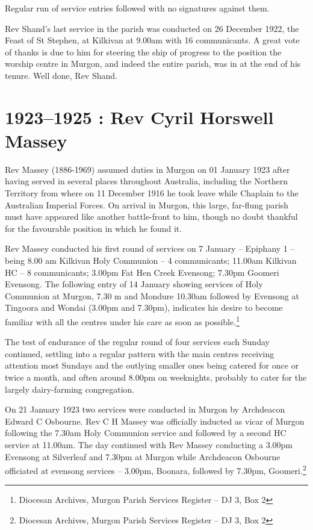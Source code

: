 Regular run of service entries followed with no signatures against them.

Rev Shand's last service in the parish was conducted on 26 December
1922, the Feast of St Stephen, at Kilkivan at 9.00am with 16
communicants. A great vote of thanks is due to him for steering the ship
of progress to the position the worship centre in Murgon, and indeed the
entire parish, was in at the end of his tenure. Well done, Rev Shand.

\begin{quote}
\end{quote}

\printendnotes
\setcounter{endnote}{0}
\chapter{1923--1925 : Rev Cyril Horswell
Massey}

Rev Massey (1886-1969) assumed duties in Murgon on 01 January 1923 after
having served in several places throughout Australia, including the
Northern Territory from where on 11 December 1916 he took leave while
Chaplain to the Australian Imperial Forces. On arrival in Murgon, this
large, far-flung parish must have appeared like another battle-front to
him, though no doubt thankful for the favourable position in which he
found it.

Rev Massey conducted his first round of services on 7 January --
Epiphany 1 -- being 8.00 am Kilkivan Holy Communion -- 4 communicants;
11.00am Kilkivan HC -- 8 communicants; 3.00pm Fat Hen Creek Evensong;
7.30pm Goomeri Evensong. The following entry of 14 January showing
services of Holy Communion at Murgon, 7.30 m and Mondure 10.30am
followed by Evensong at Tingoora and Wondai (3.00pm and 7.30pm),
indicates his desire to become familiar with all the centres under his
care as soon as possible.\footnote{Diocesan Archives, Murgon Parish
  Services Register -- DJ 3, Box 2}

The test of endurance of the regular round of four services each Sunday
continued, settling into a regular pattern with the main centres
receiving attention most Sundays and the outlying smaller ones being
catered for once or twice a month, and often around 8.00pm on
weeknights, probably to cater for the largely dairy-farming
congregation.

On 21 January 1923 two services were conducted in Murgon by Archdeacon
Edward C Osbourne. Rev C H Massey was officially inducted as vicar of
Murgon following the 7.30am Holy Communion service and followed by a
second HC service at 11.00am. The day continued with Rev Massey
conducting a 3.00pm Evensong at Silverleaf and 7.30pm at Murgon while
Archdeacon Osbourne officiated at evensong services -- 3.00pm, Boonara,
followed by 7.30pm, Goomeri.\footnote{Diocesan Archives, Murgon Parish
  Services Register -- DJ 3, Box 2}

